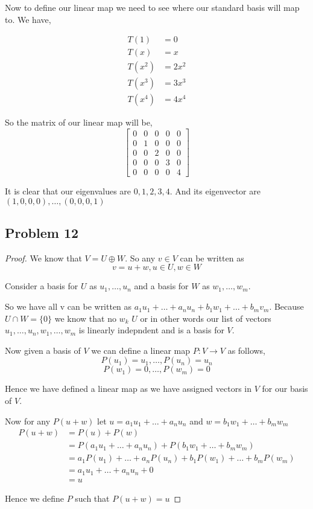 \documentclass[a4paper]{report}
\begin{document}
Now to define our linear map we need to see where our standard basis will map to.  We have,

\begin{align*}
   T(1) &= 0\\
   T(x) &= x\\
   T(x^2) &= 2x^2\\
   T(x^3) &= 3x^{3}\\
   T(x^{4}) &= 4x^{4}
\end{align*}

So the matrix of our linear map will be, 
$$ \begin{bmatrix}0 & 0 &0 &0 &0 \\ 0 & 1 & 0& 0& 0\\ 0& 0 & 2& 0& 0\\ 0& 0& 0& 3& 0\\ 0& 0& 0& 0& 4\end{bmatrix} $$ 

It is clear that our eigenvalues are $0,1,2,3,4$. And its eigenvector are  $(1,0,0,0),\dots,(0,0,0,1)$


\subsection*{Problem 12}
\begin{proof}
   We know that $V = U \oplus W$. So any  $v \in V$ can be written as 
   $$ v = u + w, u \in U, w \in W $$

   Consider a basis for $U$ as $u_1,\dots,u_n$ and a basis for $W$ as $w_1,\dots,w_m$.

   So we have all v can be written as $a_1u_1 + \dots + a_nu_n + b_1w_1 + \dots + b_mv_m$. Because $U \cap W = \{0\}$ we know that no $w_k$ \in $U$ or in other words our list of vectors $u_1,\dots,u_n, w_1,\dots,w_m$ is linearly indepndent and is a basis for $V$.

   Now given a basis of  $V$ we can define a linear map $P: V \rightarrow V$ as follows,
   $$ P(u_1) = u_1,\dots,P(u_n) = u_n $$ 
   $$ P(w_1) = 0,\dots,P(w_m) = 0 $$ 

   Hence we have defined a linear map as we have assigned vectors in $V$ for our basis of $V$.

   Now for any  $P(u + w)$ let $u = a_1u_1 + \dots + a_nu_n$ and $w = b_1w_1 + \dots + b_mw_m$
   \begin{align*}
      P(u + w) &= P(u ) + P(w)\\
               &= P(a_1u_1 + \dots + a_nu_n ) + P(b_1w_1 + \dots + b_mw_m)\\
               &= a_1P(u_1)+ \dots + a_nP(u_n) + b_1P(w_1) + \dots + b_mP(w_m)\\
               &= a_1u_1+ \dots + a_nu_n + 0\\
               &= u
   \end{align*}

   Hence we define $P$ such that $P(u + w) = u$
\end{proof}
\end{document}
